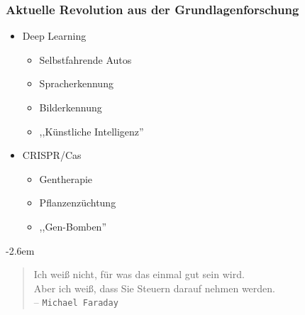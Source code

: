 \documentclass[14pt]{beamer}
\begin{document}
\begin{frame}
	\frametitle{Aktuelle Revolution aus der Grundlagenforschung}
	\begin{center}
		\begin{itemize}
			\item {\large Deep Learning}
				\begin{itemize}
					\item Selbstfahrende Autos
					\item Spracherkennung
					\item Bilderkennung
					\item ,,Künstliche Intelligenz''
				\end{itemize}
			\item {\large CRISPR/Cas}
				\begin{itemize}
					\item Gentherapie
					\item Pflanzenzüchtung
					\item ,,Gen-Bomben''
				\end{itemize}
		\end{itemize}
	\end{center}
\end{frame}

\begin{frame}
	
	\vspace{2em}
	\begingroup
	\advance\leftmargini -2.6em
	\begin{quote}
		Ich weiß nicht, für was das einmal gut sein wird.\\ Aber ich weiß, dass Sie Steuern darauf nehmen werden.\\ -- \texttt{Michael Faraday}
	\end{quote}
	\endgroup
\end{frame}
	
\end{document}
